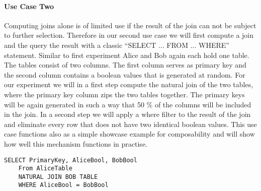 \paragraph{Use Case Two}
Computing joins alone is of limited use if the result of the join can not be subject to further selection. Therefore in our second use case we will first compute a join and the query the result with a classic ``SELECT ... FROM ... WHERE'' statement. Similar to first experiment Alice and Bob again each hold one table. The tables consist of two columns. The first column serves as primary key and the second column contains a boolean values that is generated at random. For our experiment we will in a first step compute the natural join of the two tables, where the primary key column zips the two tables together. The primary keys will be again generated in such a way that 50 \% of the columns will be included in the join. In a second step we will apply a where filter to the result of the join and eliminate every row that does not have two identical boolean values. This use case functions also as a simple showcase example for composability and will show how well this mechanism functions in practise.    
\label{SQL2_label}		
\begin{lstlisting}[caption={Functional equivalent SQL statement for our second use case}]
	SELECT PrimaryKey, AliceBool, BobBool
	From AliceTable 
	NATURAL JOIN BOB TABLE
	WHERE AliceBool = BobBool
\end{lstlisting}

 

